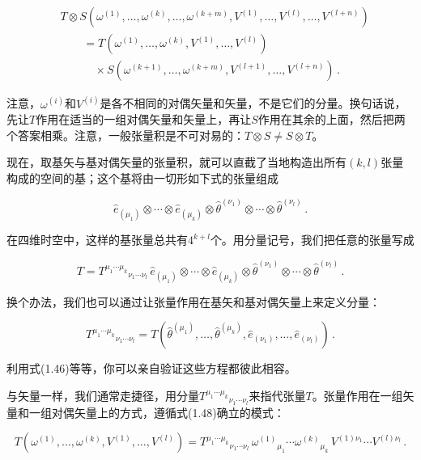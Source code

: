 \begin{align*}
&T\otimes S(\omega^{(1)},\ldots,\omega^{(k)},\ldots,\omega^{(k+m)},V^{(1)},\ldots,V^{(l)},\ldots,V^{(l+n)})\\
&\qquad =T(\omega^{(1)},\ldots,\omega^{(k)},V^{(1)},\ldots,V^{(l)})\\
&\qquad\quad\times S(\omega^{(k+1)},\ldots,\omega^{(k+m)},V^{(l+1)},\ldots,V^{(l+n)})\,.
\tag{1.58}
\end{align*}

注意，$\omega^{(i)}$和$V^{(i)}$是各不相同的对偶矢量和矢量，不是它们的分量。换句话说，先让$T$作用在适当的一组对偶矢量和矢量上，再让$S$作用在其余的上面，然后把两个答案相乘。注意，一般张量积是不可对易的：$T\otimes S\neq S\otimes T$。

现在，取基矢与基对偶矢量的张量积，就可以直截了当地构造出所有$(k,l)$张量构成的空间的基；这个基将由一切形如下式的张量组成

\begin{equation*}
\hat{e}_{(\mu_1)}\otimes\cdots\otimes\hat{e}_{(\mu_k)}
\otimes\hat{\theta}^{(\nu_1)}\otimes\cdots\otimes\hat{\theta}^{(\nu_l)}\,.
\tag{1.59}
\end{equation*}

在四维时空中，这样的基张量总共有$4^{k+l}$个。用分量记号，我们把任意的张量写成

\begin{equation*}
T=T^{\mu_1\cdots\mu_k}{}_{\nu_1\cdots\nu_l}\,
\hat{e}_{(\mu_1)}\otimes\cdots\otimes\hat{e}_{(\mu_k)}
\otimes\hat{\theta}^{(\nu_1)}\otimes\cdots\otimes\hat{\theta}^{(\nu_l)}\,.
\tag{1.60}
\end{equation*}

换个办法，我们也可以通过让张量作用在基矢和基对偶矢量上来定义分量：

\begin{equation*}
T^{\mu_1\cdots\mu_k}{}_{\nu_1\cdots\nu_l}
=T(\hat{\theta}^{(\mu_1)},\ldots,\hat{\theta}^{(\mu_k)},\hat{e}_{(\nu_1)},\ldots,\hat{e}_{(\nu_l)})\,.
\tag{1.61}
\end{equation*}

利用式(1.46)等等，你可以亲自验证这些方程都彼此相容。

与矢量一样，我们通常走捷径，用分量$T^{\mu_1\cdots\mu_k}{}_{\nu_1\cdots\nu_l}$来指代张量$T$。张量作用在一组矢量和一组对偶矢量上的方式，遵循式(1.48)确立的模式：

\begin{equation*}
T(\omega^{(1)},\ldots,\omega^{(k)},V^{(1)},\ldots,V^{(l)})
=T^{\mu_1\cdots\mu_k}{}_{\nu_1\cdots\nu_l}\,
\omega^{(1)}{}_{\mu_1}\cdots\omega^{(k)}{}_{\mu_k}\,
V^{(1)\nu_1}\cdots V^{(l)\nu_l}\,.
\tag{1.62}
\end{equation*}

